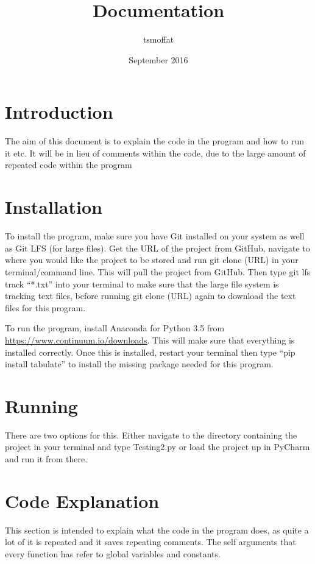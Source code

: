 \documentclass{article}
\title{Documentation}
\author{tsmoffat}
\date{September 2016}
\newcommand{\q}[1]{``#1''}
\begin{document}
\maketitle

\section{Introduction}
The aim of this document is to explain the code in the program and how to run it etc. It will be in lieu of comments within the code, due to the large amount of repeated code
within the program

\section{Installation}
To install the program, make sure you have Git installed on your system as well as Git LFS (for large files). Get the URL of the project from GitHub, navigate to
where you would like the project to be stored and run git clone (URL) in your terminal/command line. This will pull the project from GitHub. Then type git lfs track
\q{*.txt} into your terminal to make sure that the large file system is tracking text files, before running git clone (URL) again to download the text files for this program.
\par To run the program, install Anaconda for Python 3.5 from \url{https://www.continuum.io/downloads}. This will make sure that everything is installed correctly. Once this
is installed, restart your terminal then type \q{pip install tabulate} to install the missing package needed for this program.


\section{Running}
There are two options for this. Either navigate to the directory containing the project in your terminal and type Testing2.py
or load the project up in PyCharm and run it from there.

\section{Code Explanation}
This section is intended to explain what the code in the program does, as quite a lot of it is repeated and it saves repeating comments. The self arguments that every function has
refer to global variables and constants.
\end{document}
